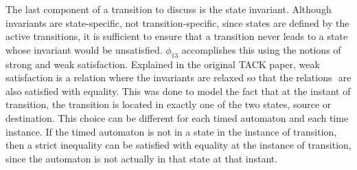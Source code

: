 \documentclass[a4paper,12pt]{article}
\begin{document}
The last component of a transition to discuss is the state invariant. Although
invariants are state-specific, not transition-specific, since states are defined
by the active transitions, it is sufficient to ensure that a transition never
leads to a state whose invariant would be unsatisfied. \(\phi_{13}\)
accomplishes this using the notions of strong and weak satisfaction. Explained
in the original TACK paper, weak satisfaction is a relation where the invariants
are relaxed so that the relations \(<,>\) are also satisfied with equality. This
was done to model the fact that at the instant of transition, the transition is
located in exactly one of the two states, source or destination. This choice can
be different for each timed automaton and each time instance. If the timed
automaton is not in a state in the instance of transition, then a strict
inequality can be satisfied with equality at the instance of transition, since
the automaton is not actually in that state at that instant.
\end{document}
